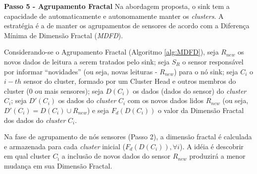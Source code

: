 \documentclass{acm_proc_article-sp}
\begin{document}
{\bf Passo 5 - Agrupamento Fractal}
Na abordagem proposta, o sink tem a capacidade de automaticamente e
autonomamente manter os {\it clusters}. A estratégia é a de manter os
agrupamentos de sensores de acordo com a Diferença Mínima de Dimensão Fractal
({\it MDFD}).
\vspace*{-.3cm}

Considerando-se o Agrupamento Fractal (Algoritmo \ref {alg:MDFD}),
seja $R_{new}$ os novos dados de leitura a serem tratados pelo sink;
seja $S_{R}$ o sensor responsável por informar ``novidades''
(ou seja, novas leituras - $R_{new}$) para o nó sink; seja $C_i$ o
$i-th$ sensor do cluster, formado por um Cluster Head e outros membros do cluster
(0 ou mais sensores); seja $D(C_i)$ os dados (dados do sensor) do 
{\it cluster} $C_i$; seja $D'(C_i)$ os dados do {\it cluster} $C_i$ com
os novos dados lidos $R_{new}$ (ou seja, $D'(C_i) = D(C_i) \cup R_{new}$) 
e seja $F_{d}(D(C_i))$ o valor da Dimensão Fractal dos dados do {\it cluster} $C_i$.
\vspace*{-.3cm}

Na fase de agrupamento de nós sensores (Passo 2), a dimensão fractal é 
calculada e armazenada para cada {\it cluster} inicial 
($F_{d}(D(C_i)), \forall i$). A idéia é descobrir em qual cluster
$C_{\hat{\imath}}$ a inclusão de novos dados do sensor $R_{new}$
produzirá a menor mudança em sua Dimensão Fractal.
\vspace*{-.3cm}
\end{document}
